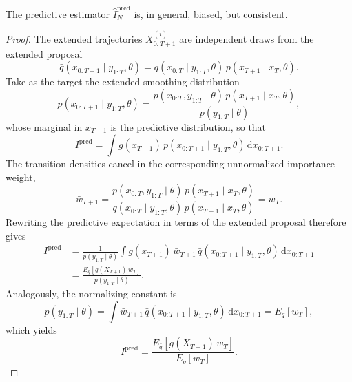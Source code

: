 \begin{proposition}
    \label{prop:predictive_estimator}
    The predictive estimator $\hat{I}_N^{\mathrm{pred}}$ is, in general, biased, but consistent.
\end{proposition}
\begin{proof}
    The extended trajectories $X_{0:T+1}^{(i)}$ are independent draws from the extended proposal
    \begin{equation}
        \bar{q}(x_{0:T+1}\mid y_{1:T},\theta) = q(x_{0:T}\mid y_{1:T},\theta)\,p(x_{T+1}\mid x_T,\theta).
    \end{equation}
    Take as the target the extended smoothing distribution
    \begin{equation}
        p(x_{0:T+1}\mid y_{1:T},\theta) = \frac{p(x_{0:T},y_{1:T}\mid\theta)\,p(x_{T+1}\mid x_T,\theta)}{p(y_{1:T}\mid\theta)},
    \end{equation}
    whose marginal in $x_{T+1}$ is the predictive distribution, so that
    \begin{equation}
        I^{\mathrm{pred}} = \int g(x_{T+1})\,p(x_{0:T+1}\mid y_{1:T},\theta)\,\mathrm{d}x_{0:T+1}.
    \end{equation}
    The transition densities cancel in the corresponding unnormalized importance weight,
    \begin{equation}
        \bar{w}_{T+1} = \frac{p(x_{0:T},y_{1:T}\mid\theta)\,p(x_{T+1}\mid x_T,\theta)}{q(x_{0:T}\mid y_{1:T},\theta)\,p(x_{T+1}\mid x_T,\theta)} = w_T.
    \end{equation}
    Rewriting the predictive expectation in terms of the extended proposal therefore gives
    \begin{align}
        I^{\mathrm{pred}} &= \frac{1}{p(y_{1:T}\mid\theta)} \int g(x_{T+1})\, \bar{w}_{T+1}\, \bar{q}(x_{0:T+1}\mid y_{1:T},\theta)\,\mathrm{d}x_{0:T+1} \\
        &= \frac{E_{\bar{q}}\left[g(X_{T+1})\,w_T\right]}{p(y_{1:T}\mid\theta)}.
    \end{align}
    Analogously, the normalizing constant is
    \begin{equation}
        p(y_{1:T}\mid\theta) = \int \bar{w}_{T+1}\, \bar{q}(x_{0:T+1}\mid y_{1:T},\theta)\,\mathrm{d}x_{0:T+1} = E_{\bar{q}}\left[w_T\right],
    \end{equation}
    which yields
    \begin{equation}
        I^{\mathrm{pred}} = \frac{E_{\bar{q}}\left[g(X_{T+1})\,w_T\right]}{E_{\bar{q}}\left[w_T\right]}.
    \end{equation}

\end{proof}
